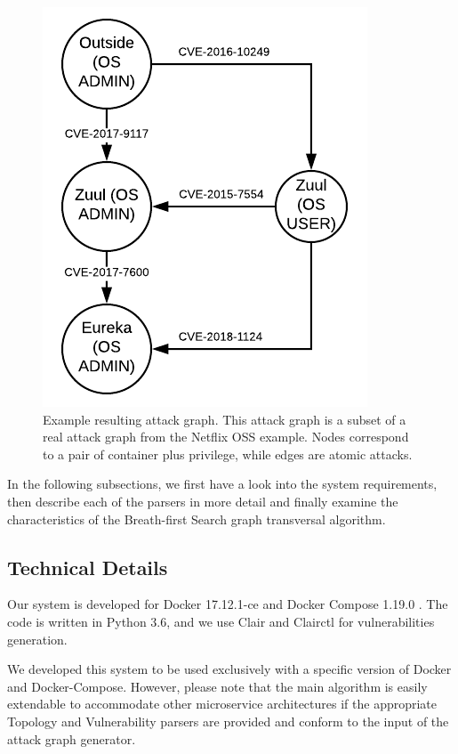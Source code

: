 \begin{figure}
	\includegraphics[]{./images/Attack_graph}
	\caption{Example resulting attack graph. This attack graph is a subset of a real attack graph from the Netflix OSS example. Nodes correspond to a pair of container plus privilege, while edges are atomic attacks.}
	\label{AttackGraph}
\end{figure}


In the following subsections, we first have a look into the system requirements, then describe each of the parsers in more detail and finally examine the characteristics of the Breath-first Search graph transversal algorithm.

\subsection{Technical Details}
\label{chap:technical}

Our system is developed for Docker 17.12.1-ce and Docker Compose 1.19.0 \cite{merkel2014docker}. The code is written in Python 3.6, and we use Clair \cite{clair} and Clairctl \cite{clairctl} for vulnerabilities generation.

We developed this system to be used exclusively with a specific version of Docker and Docker-Compose. However, please note that the main algorithm is easily extendable to accommodate other microservice architectures if the appropriate Topology and Vulnerability parsers are provided and conform to the input of the attack graph generator.

